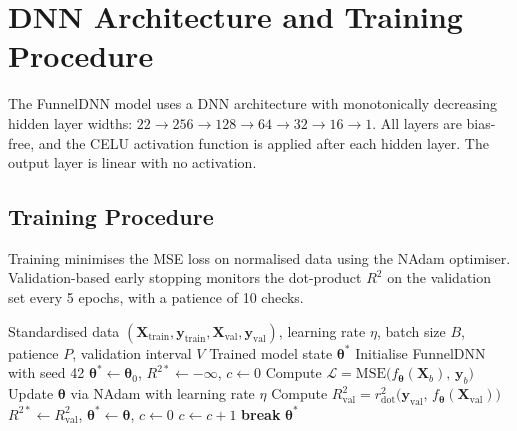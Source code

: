 \section{DNN Architecture and Training Procedure}
\label{annexure:dnn_training}

The FunnelDNN model uses a DNN architecture with monotonically decreasing hidden layer widths: $22 \to 256 \to 128 \to 64 \to 32 \to 16 \to 1$. All layers are bias-free, and the CELU activation function is applied after each hidden layer. The output layer is linear with no activation.

\subsection{Training Procedure}
\label{annexure:train_model}

Training minimises the MSE loss on normalised data using the NAdam optimiser. Validation-based early stopping monitors the dot-product \ensuremath{R^2} on the validation set every 5 epochs, with a patience of 10 checks.

\begin{algorithm}[htbp]
\caption{FunnelDNN training with early stopping.}
\label{alg:dnn_training}
\begin{algorithmic}[1]
\Require Standardised data $(\mathbf{X}_{\mathrm{train}}, \mathbf{y}_{\mathrm{train}}, \mathbf{X}_{\mathrm{val}}, \mathbf{y}_{\mathrm{val}})$, learning rate $\eta$, batch size $B$, patience $P$, validation interval $V$
\Ensure Trained model state $\boldsymbol{\theta}^*$
\State Initialise FunnelDNN with seed 42
\State $\boldsymbol{\theta}^* \gets \boldsymbol{\theta}_0$, \; $R^{2*} \gets -\infty$, \; $c \gets 0$
        \State Compute $\mathcal{L} = \mathrm{MSE}\bigl(f_{\boldsymbol{\theta}}(\mathbf{X}_b),\, \mathbf{y}_b\bigr)$
        \State Update $\boldsymbol{\theta}$ via NAdam with learning rate $\eta$
    \EndFor
        \State Compute $R^2_{\mathrm{val}} = r^2_{\mathrm{dot}}\bigl(\mathbf{y}_{\mathrm{val}},\, f_{\boldsymbol{\theta}}(\mathbf{X}_{\mathrm{val}})\bigr)$
            \State $R^{2*} \gets R^2_{\mathrm{val}}$, \; $\boldsymbol{\theta}^* \gets \boldsymbol{\theta}$, \; $c \gets 0$
        \Else
            \State $c \gets c + 1$
        \EndIf
            \State \textbf{break} 
        \EndIf
    \EndIf
\EndFor
\State \Return $\boldsymbol{\theta}^*$
\end{algorithmic}
\end{algorithm}

